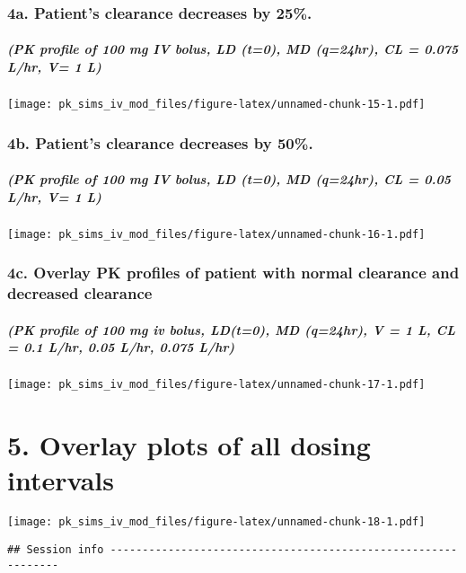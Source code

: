 \documentclass[]{article}
\begin{document}
\subsubsection{4a. Patient's clearance decreases by
25\%.}\label{a.-patients-clearance-decreases-by-25.-3}

\subparagraph{(PK profile of 100 mg IV bolus, LD (t=0), MD (q=24hr), CL
= 0.075 L/hr, V= 1
L)}\label{pk-profile-of-100-mg-iv-bolus-ld-t0-md-q24hr-cl-0.075-lhr-v-1-l}

\texttt{[image: pk\_sims\_iv\_mod\_files/figure-latex/unnamed-chunk-15-1.pdf]}

\subsubsection{4b. Patient's clearance decreases by
50\%.}\label{b.-patients-clearance-decreases-by-50.-3}

\subparagraph{(PK profile of 100 mg IV bolus, LD (t=0), MD (q=24hr), CL
= 0.05 L/hr, V= 1
L)}\label{pk-profile-of-100-mg-iv-bolus-ld-t0-md-q24hr-cl-0.05-lhr-v-1-l}

\texttt{[image: pk\_sims\_iv\_mod\_files/figure-latex/unnamed-chunk-16-1.pdf]}

\subsubsection{4c. Overlay PK profiles of patient with normal clearance
and decreased
clearance}\label{c.-overlay-pk-profiles-of-patient-with-normal-clearance-and-decreased-clearance-2}

\subparagraph{(PK profile of 100 mg iv bolus, LD(t=0), MD (q=24hr), V =
1 L, CL = 0.1 L/hr, 0.05 L/hr, 0.075
L/hr)}\label{pk-profile-of-100-mg-iv-bolus-ldt0-md-q24hr-v-1-l-cl-0.1-lhr-0.05-lhr-0.075-lhr}

\texttt{[image: pk\_sims\_iv\_mod\_files/figure-latex/unnamed-chunk-17-1.pdf]}

\section{5. Overlay plots of all dosing
intervals}\label{overlay-plots-of-all-dosing-intervals}

\texttt{[image: pk\_sims\_iv\_mod\_files/figure-latex/unnamed-chunk-18-1.pdf]}

\begin{verbatim}
## Session info --------------------------------------------------------------
\end{verbatim}
\end{document}
